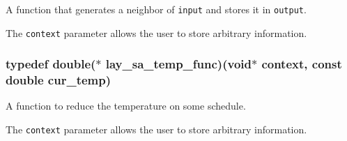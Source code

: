 A function that generates a neighbor of {\tt input} and stores it in {\tt output}. 

The {\tt context} parameter allows the user to store arbitrary information. 
\subsubsection{\setlength{\rightskip}{0pt plus 5cm}typedef double($\ast$ {\bf lay\_\-sa\_\-temp\_\-func})(void$\ast$ context, const double cur\_\-temp)}\label{sim__anneal_8h_a2}


A function to reduce the temperature on some schedule. 

The {\tt context} parameter allows the user to store arbitrary information. 